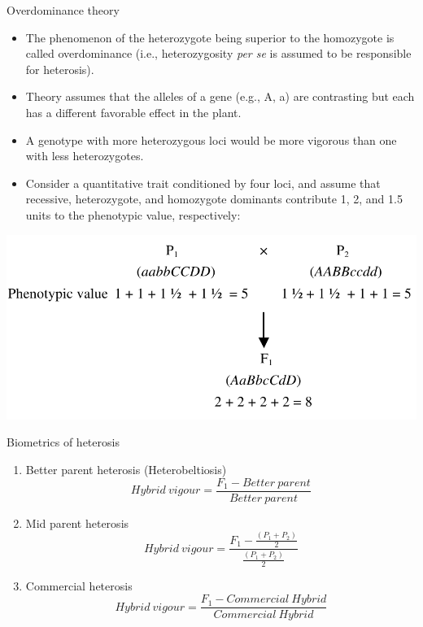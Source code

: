 \documentclass[11pt,dvipsnames,ignorenonframetext,aspectratio=169]{beamer}
\providecommand{\tightlist}{%
  \setlength{\itemsep}{0pt}\setlength{\parskip}{0pt}}
\begin{document}
\begin{frame}{Overdominance theory}
\protect\hypertarget{overdominance-theory}{}
\footnotesize

\begin{itemize}
\tightlist
\item
  The phenomenon of the heterozygote being superior to the homozygote is
  called overdominance (i.e., heterozygosity \emph{per se} is assumed to
  be responsible for heterosis).
\item
  Theory assumes that the alleles of a gene (e.g., A, a) are contrasting
  but each has a different favorable effect in the plant.
\item
  A genotype with more heterozygous loci would be more vigorous than one
  with less heterozygotes.
\item
  Consider a quantitative trait conditioned by four loci, and assume
  that recessive, heterozygote, and homozygote dominants contribute 1,
  2, and 1.5 units to the phenotypic value, respectively:
\end{itemize}

\begin{center}\includegraphics[width=0.3\linewidth]{../images/overdominance_theory} \end{center}
\end{frame}

\begin{frame}{Biometrics of heterosis}
\protect\hypertarget{biometrics-of-heterosis}{}
\begin{enumerate}
\tightlist
\item
  Better parent heterosis (Heterobeltiosis)
  \[Hybrid~vigour = \frac{F_1-Better~parent}{Better~parent}\]
\item
  Mid parent heterosis
  \[Hybrid~vigour = \frac{F_1-\frac{(P_1+P_2)}{2}}{\frac{(P_1+P_2)}{2}}\]
\item
  Commercial heterosis
  \[Hybrid~vigour = \frac{F_1-Commercial~Hybrid}{Commercial~Hybrid}\]
\end{enumerate}
\end{frame}
\end{document}

